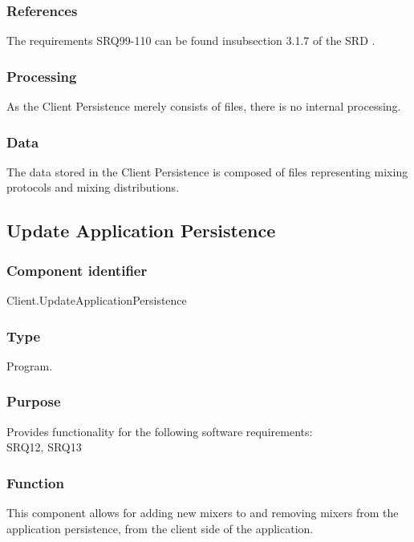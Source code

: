 \subsubsection*{References}
The requirements SRQ99-110 can be found insubsection 3.1.7 of the SRD \cite{srd}.

\subsubsection*{Processing}
As the Client Persistence merely consists of files, there is no internal processing.

\subsubsection*{Data}
The data stored in the Client Persistence is composed of files representing mixing protocols and mixing distributions.

\subsection{Update Application Persistence}

\subsubsection*{Component identifier}
Client.UpdateApplicationPersistence

\subsubsection*{Type}
Program.

\subsubsection*{Purpose}
Provides functionality for the following software requirements:\\
SRQ12, SRQ13

\subsubsection*{Function}
This component allows for adding new mixers to and removing mixers from the application persistence, from the client side of the application.

